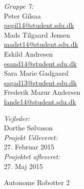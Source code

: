 \begin{titlepage}
\begin{center}
\begin{minipage}{0.50\textwidth}
\begin{flushleft}\large
\emph{Gruppe 7:}\\
\vspace{4mm}
Peter Gilsaa \\
\href{mailto:pegil14@student.sdu.dk}{\color{sdu_blue}pegil14@student.sdu.dk}\\
\vspace{4mm}
Mads Tilgaard Jensen\\
\href{mailto:madst14@student.sdu.dk}{\color{sdu_blue}madst14@student.sdu.dk}\\
\vspace{4mm}
Eskild Andresen\\
\href{mailto:esand14@student.sdu.dk}{\color{sdu_blue}esand14@student.sdu.dk}\\
\vspace{4mm}
Sara Marie Gadgaard\\
\href{mailto:sagad13@student.sdu.dk}{\color{sdu_blue}sagad13@student.sdu.dk}\\
\vspace{4mm}
Frederik Mazur Andersen\\
\href{mailto:fande14@student.sdu.dk}{\color{sdu_blue}fande14@student.sdu.dk}\\
\end{flushleft}
\end{minipage}
\begin{minipage}[c][2cm]{0.45\textwidth}
\begin{flushright} \large
\vspace{2cm}
\emph{Vejleder:} \\
Dorthe Sølvason  \\
\vspace{2cm}
\emph{Projekt Udleveret:} \\
27. Februar 2015 \\
\vspace{4mm}
\emph{Projektet afleveret:} \\
27. Maj 2015
\end{flushright}
\end{minipage}

\vfill

{\Large Autonome Robotter 2}
\end{center}
\end{titlepage}
